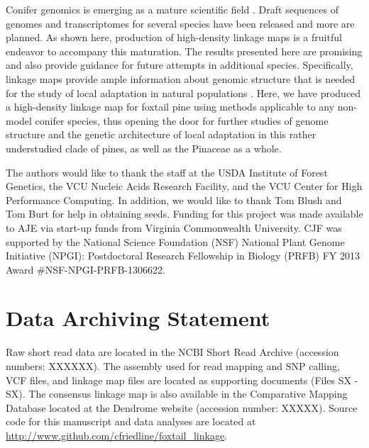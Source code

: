 \documentclass[smallextended]{svjour3}
\begin{document}
Conifer genomics is emerging as a mature scientific field
\citep{Mackay:2012}. Draft sequences of genomes and transcriptomes for several
species have been released and more are planned. As shown here, production of
high-density linkage maps is a fruitful endeavor to accompany this
maturation. The results presented here are promising and also provide guidance
for future attempts in additional species.  Specifically, linkage maps provide
ample information about genomic structure that is needed for the study of local
adaptation in natural populations \citep[cf.,][]{Limborg:2014}. Here, we have
produced a high-density linkage map for foxtail pine using methods applicable to
any non-model conifer species, thus opening the door for further studies of
genome structure and the genetic architecture of local adaptation in this rather
understudied clade of pines, as well as the Pinaceae as a whole.

\begin{acknowledgements}
  The authors would like to thank the staff at the USDA Institute of Forest
  Genetics, the VCU Nucleic Acids Research Facility, and the VCU Center for High
  Performance Computing.  In addition, we would like to thank Tom Blush and Tom
  Burt for help in obtaining seeds. Funding for this project was made available
  to AJE via start-up funds from Virginia Commonwealth University. CJF was
  supported by the National Science Foundation (NSF) National Plant Genome
  Initiative (NPGI): Postdoctoral Research Fellowship in Biology (PRFB) FY 2013
  Award \#NSF-NPGI-PRFB-1306622.
\end{acknowledgements}


\section*{Data Archiving Statement}

Raw short read data are located in the NCBI Short Read Archive (accession
numbers: XXXXXX).  The assembly used for read mapping and SNP calling, VCF
files, and linkage map files are located as supporting documents (Files SX -
SX).  The consensus linkage map is also available in the Comparative Mapping
Database located at the Dendrome website (accession number: XXXXX). Source 
code for this manuscript and data analyses are located at 
\url{http://www.github.com/cfriedline/foxtail_linkage}. 


\clearpage




\end{document}
